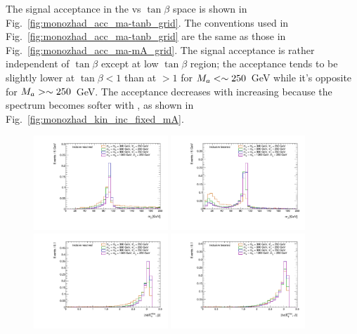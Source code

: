The signal acceptance in the \ma vs $\tan\beta$ space is shown in Fig.~\ref{fig:monozhad_acc_ma-tanb_grid}. 
The conventions used in Fig.~\ref{fig:monozhad_acc_ma-tanb_grid} are the same as those in 
Fig.~\ref{fig:monozhad_acc_ma-mA_grid}.
The signal acceptance is rather independent of $\tan\beta$ except at low $\tan\beta$ region; the acceptance 
tends to be slightly lower at $\tan\beta<1$ than at $>1$ for $M_{a}<\sim250$~GeV while it's opposite for 
$M_{a}>\sim250$~GeV. The acceptance decreases with increasing \ma because the \MET spectrum becomes 
softer with \ma, as shown in Fig.~\ref{fig:monozhad_kin_inc_fixed_mA}.


\begin{figure}
\centering
\includegraphics[width=0.45\textwidth]{texinputs/04_grid/figures/monoz/hadronic/ma250_incl_resl_MJJ_linear.pdf}
\includegraphics[width=0.45\textwidth]{texinputs/04_grid/figures/monoz/hadronic/ma250_incl_merged_MFatJ1_linear.pdf}
\includegraphics[width=0.45\textwidth]{texinputs/04_grid/figures/monoz/hadronic/ma250_incl_resl_dPhiMETJJ_linear.pdf}
\includegraphics[width=0.45\textwidth]{texinputs/04_grid/figures/monoz/hadronic/ma250_incl_merged_dPhiMETJ_linear.pdf}

\end{figure}
